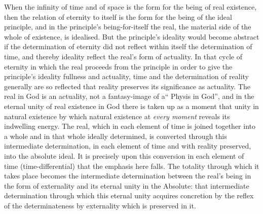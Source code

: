 \documentclass[12pt,a4paper]{book}
\begin{document}
When the infinity of time and of space is the form for the being of real
existence, then the relation of eternity to itself is the form for the being
of the ideal principle, and in the principle's being-for-itself the real, the
material side of the whole of existence, is idealised. But the principle's
ideality would become abstract if the determination of eternity did not
reflect within itself the determination of time, and thereby ideality reflect
the real's form of actuality. In that cycle of eternity in which the real
proceeds from the principle in order to give the principle's ideality fullness
and actuality, time and the determination of reality generally are so
reflected that reality preserves its significance as actuality. The real in
God is an actuality, not a fantasy-image of a`` Physis in God'', and in the
eternal unity of real existence in God there is taken up as a moment that
unity in natural existence by which natural existence at \emph{every moment}
reveals its indwelling energy. The real, which in each element of time is
joined together into a whole and in that whole ideally determined, is
converted through this intermediate determination, in each element of time and
with reality preserved, into the absolute ideal. It is precisely upon this
conversion in each element of time (time-differential) that the emphasis here
falls. The totality through which it takes place becomes the intermediate
determination between the real's being in the form of externality and its
eternal unity in the Absolute: that intermediate determination through which
this eternal unity acquires concretion by the reflex of the determinateness by
externality which is preserved in it.
\end{document}
